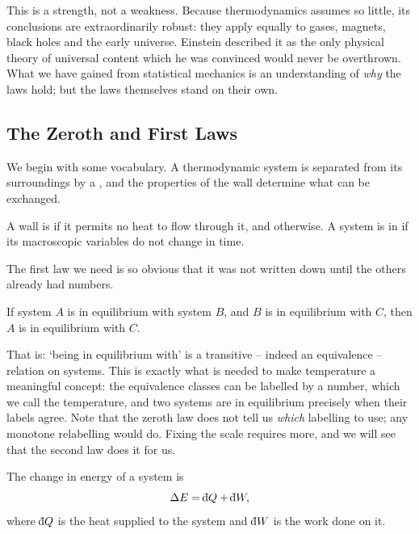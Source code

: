 \documentclass[a4paper]{scrartcl}
\newcommand{\dbar}{\mathchar'26\mkern-11mu \mathrm{d}}
\begin{document}
This is a strength, not a weakness. Because thermodynamics assumes so little, its conclusions are extraordinarily robust: they apply equally to gases, magnets, black holes and the early universe. Einstein described it as the only physical theory of universal content which he was convinced would never be overthrown. What we have gained from statistical mechanics is an understanding of \emph{why} the laws hold; but the laws themselves stand on their own.

\subsection{The Zeroth and First Laws}

We begin with some vocabulary. A thermodynamic system is separated from its surroundings by a , and the properties of the wall determine what can be exchanged.

\begin{definition}
	A wall is  if it permits no heat to flow through it, and  otherwise. A system is in  if its macroscopic variables do not change in time.
\end{definition}

The first law we need is so obvious that it was not written down until the others already had numbers.

\begin{law}
	If system $A$ is in equilibrium with system $B$, and $B$ is in equilibrium with $C$, then $A$ is in equilibrium with $C$.
\end{law}

That is: `being in equilibrium with' is a transitive -- indeed an equivalence -- relation on systems. This is exactly what is needed to make temperature a meaningful concept: the equivalence classes can be labelled by a number, which we call the temperature, and two systems are in equilibrium precisely when their labels agree. Note that the zeroth law does not tell us \emph{which} labelling to use; any monotone relabelling would do. Fixing the scale requires more, and we will see that the second law does it for us.

\begin{law}
	The change in energy of a system is
	$$
	\Delta E = \dbar Q + \dbar W,
	$$
	where $\dbar Q$ is the heat supplied to the system and $\dbar W$ is the work done on it.
\end{law}
\end{document}
